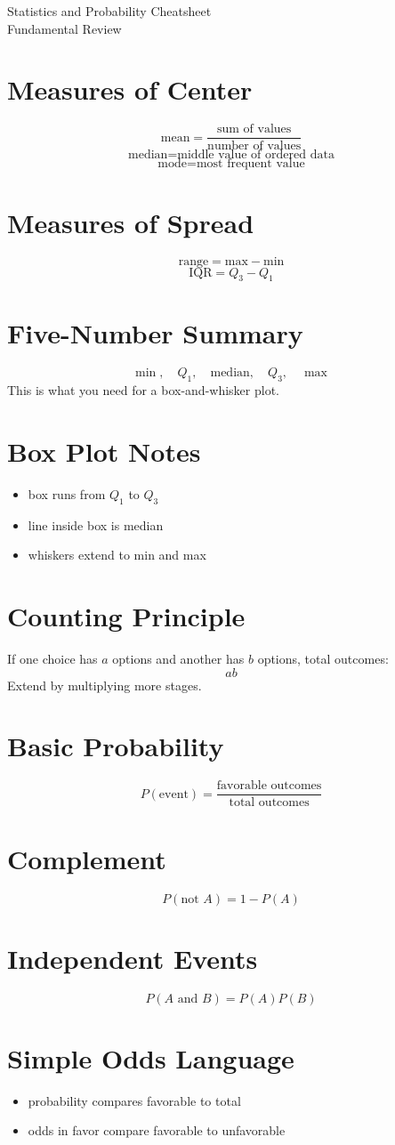 \documentclass[11pt]{article}
\begin{document}
\begin{center}
{\LARGE Statistics and Probability Cheatsheet}\\[0.4em]
{\large Fundamental Review}
\end{center}

\section*{Measures of Center}
\[
\text{mean}=\frac{\text{sum of values}}{\text{number of values}}
\]
\[
\text{median}=\text{middle value of ordered data}
\]
\[
\text{mode}=\text{most frequent value}
\]

\section*{Measures of Spread}
\[
\text{range}=\text{max}-\text{min}
\]
\[
\mathrm{IQR}=Q_3-Q_1
\]

\section*{Five-Number Summary}
\[
\min,\quad Q_1,\quad \text{median},\quad Q_3,\quad \max
\]
This is what you need for a box-and-whisker plot.

\section*{Box Plot Notes}
\begin{itemize}
  \item box runs from $Q_1$ to $Q_3$
  \item line inside box is median
  \item whiskers extend to min and max
\end{itemize}

\section*{Counting Principle}
If one choice has $a$ options and another has $b$ options, total outcomes:
\[
ab
\]
Extend by multiplying more stages.

\section*{Basic Probability}
\[
P(\text{event})=\frac{\text{favorable outcomes}}{\text{total outcomes}}
\]

\section*{Complement}
\[
P(\text{not }A)=1-P(A)
\]

\section*{Independent Events}
\[
P(A\text{ and }B)=P(A)P(B)
\]

\section*{Simple Odds Language}
\begin{itemize}
  \item probability compares favorable to total
  \item odds in favor compare favorable to unfavorable
\end{itemize}
\end{document}
